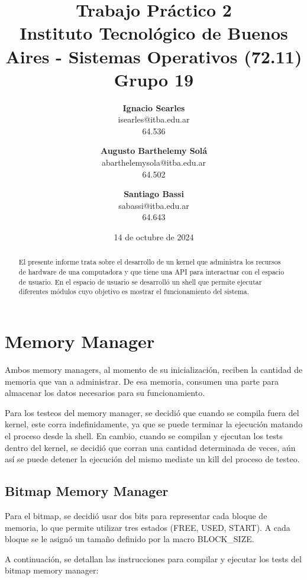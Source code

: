 \documentclass{article}
\title{\textbf{Trabajo Práctico 2} \\ [1ex]
\large Instituto Tecnológico de Buenos Aires - Sistemas Operativos (72.11) \\ [1ex]
\large Grupo 19 }
\date{14 de octubre de 2024}
\author{
\textbf{Ignacio Searles}\\
isearles@itba.edu.ar\\
64.536
\and
\textbf{Augusto Barthelemy Solá}\\
abarthelemysola@itba.edu.ar\\
64.502
\and
\textbf{Santiago Bassi}\\
sabassi@itba.edu.ar\\
64.643
}
\begin{document}
\maketitle

\begin {abstract}

El presente informe trata sobre el desarrollo de un kernel que administra los recursos de hardware de una computadora y que tiene una API para interactuar con el espacio de usuario. En el espacio de usuario se desarrolló un shell que permite ejecutar diferentes módulos cuyo objetivo es mostrar el funcionamiento del sistema.

\end {abstract}

\section {Memory Manager}

Ambos memory managers, al momento de su inicialización, reciben la cantidad de memoria que van a administrar. De esa memoria, consumen una parte para almacenar los datos necesarios para su funcionamiento.

Para los testeos del memory manager, se decidió que cuando se compila fuera del kernel, este corra indefinidamente, ya que se puede terminar la ejecución matando el proceso desde la shell. En cambio, cuando se compilan y ejecutan los tests dentro del kernel, se decidió que corran una cantidad determinada de veces, aún así se puede detener la ejecución del mismo mediate un kill del proceso de testeo.

\subsection {Bitmap Memory Manager}

Para el bitmap, se decidió usar dos bits para representar cada bloque de memoria, lo que permite utilizar tres estados (FREE, USED, START). A cada bloque se le asignó un tamaño definido por la macro BLOCK\_SIZE.

A continuación, se detallan las instrucciones para compilar y ejecutar los tests del bitmap memory manager:
\end{document}
